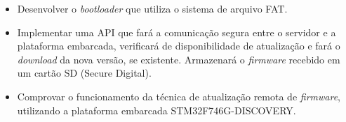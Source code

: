  \begin{itemize}
   \item Desenvolver o \textit{bootloader} que utiliza o sistema de arquivo FAT.
   
   
   \item Implementar uma API que fará a comunicação segura entre o servidor e a plataforma embarcada, verificará de disponibilidade de atualização e fará o \textit{download} da nova versão, se existente. Armazenará o \textit{firmware} recebido em um cartão SD (Secure Digital). 
   
   \item Comprovar o funcionamento da técnica de atualização remota de \textit{firmware}, utilizando a plataforma embarcada STM32F746G-DISCOVERY.
   
 \end{itemize}
 
